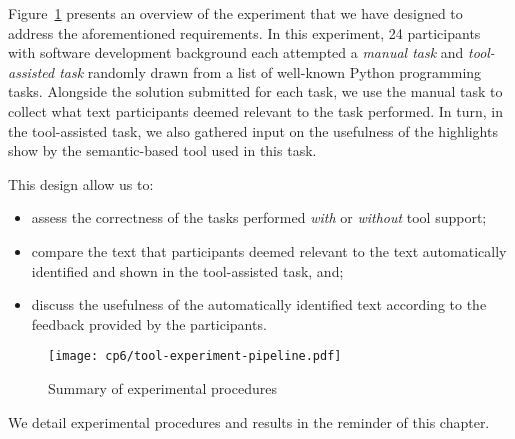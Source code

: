 Figure~\ref{fig:tool-experiment-procedures} presents an overview of the experiment that we have designed to address the aforementioned requirements. In this experiment, 24 participants with software development background each attempted a
\textit{manual task} and \textit{tool-assisted task} randomly drawn from a list of well-known Python programming tasks.
Alongside the solution submitted for each task, we use the manual task to collect what text participants deemed relevant to the task performed.
In turn, in the tool-assisted task, we also gathered input on the usefulness of the highlights show by the semantic-based tool
used in this task. 


This design allow us to:




\begin{itemize}
    \item assess the correctness of the tasks performed \textit{with} or \textit{without} tool support;
    \item compare  the text that participants deemed relevant to the text automatically identified
    and shown in the tool-assisted task, and;
    \item discuss the usefulness of the automatically identified text according to the feedback provided by the participants.
\end{itemize}
 





\begin{figure}
\centering
\texttt{[image: cp6/tool-experiment-pipeline.pdf]}
\caption{Summary of experimental procedures}
\label{fig:tool-experiment-procedures}
\end{figure}





We detail experimental procedures and results in the reminder of this chapter.





 

 

